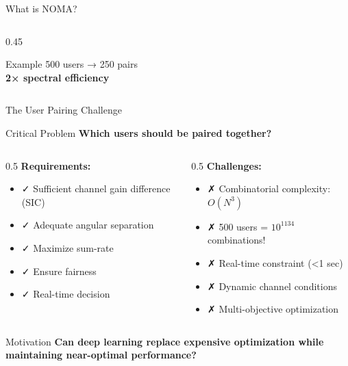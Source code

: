 \documentclass[aspectratio=169]{beamer}
\begin{document}
\begin{frame}{What is NOMA?}
\begin{columns}
\begin{column}{0.45\textwidth}
            \vspace{0.3cm}
            \begin{exampleblock}{Example}
                500 users → 250 pairs\\
                \textbf{2× spectral efficiency}
            \end{exampleblock}
        \end{column}
    \end{columns}
\end{frame}

\begin{frame}{The User Pairing Challenge}
    \begin{block}{Critical Problem}
        \textbf{Which users should be paired together?}
    \end{block}
    
    \vspace{0.3cm}
    
    \begin{columns}
        \begin{column}{0.5\textwidth}
            \textbf{Requirements:}
            \begin{itemize}
                \item ✓ Sufficient channel gain difference (SIC)
                \item ✓ Adequate angular separation
                \item ✓ Maximize sum-rate
                \item ✓ Ensure fairness
                \item ✓ Real-time decision
            \end{itemize}
        \end{column}
        \begin{column}{0.5\textwidth}
            \textbf{Challenges:}
            \begin{itemize}
                \item ✗ Combinatorial complexity: $O(N^3)$
                \item ✗ 500 users = $10^{1134}$ combinations!
                \item ✗ Real-time constraint (<1 sec)
                \item ✗ Dynamic channel conditions
                \item ✗ Multi-objective optimization
            \end{itemize}
        \end{column}
    \end{columns}
    
    \vspace{0.3cm}
    
    \begin{alertblock}{Motivation}
        \textbf{Can deep learning replace expensive optimization while maintaining near-optimal performance?}
    \end{alertblock}
\end{frame}
\end{document}
